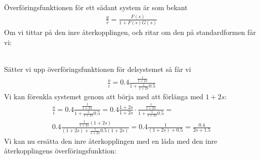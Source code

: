\documentclass[a4paper]{article}
\begin{document}
%
%
Överföringsfunktionen för ett sådant system är som bekant
\begin{align*}
  \frac{y}{r} = \frac{F(s)}{1 + F(s)G(s)}
\end{align*}
%
%
Om vi tittar på den inre återkopplingen, och ritar om den på standardformen får vi:\\
%
%
\\
%
%
Sätter vi upp överföringsfunktionen för delsystemet så får vi
\begin{align*}
  \frac{o}{i} = 0.4 \frac{\frac{1}{1+2s}}{1+\frac{1}{1+2s}0.5}
\end{align*}
%
Vi kan förenkla systemet genom att börja med att förlänga med $1+2s$:
\begin{align*}
  \frac{o}{i} = 0.4 \frac{\frac{1}{1+2s}}{1+\frac{1}{1+2s}0.5} = 0.4 \frac{1+2s}{1+2s} \cdot \frac{\frac{1}{1+2s}}{1+\frac{1}{1+2s}0.5} =\\
  0.4 \frac{\frac{1}{1+2s}(1+2s)}{(1+2s) + \frac{1}{1+2s}0.5(1+2s)} = 0.4 \frac{1}{(1+2s) + 0.5} = \frac{0.4}{2s + 1.5}
\end{align*}
%
%
Vi kan nu ersätta den inre återkopplingen med en låda med den inre återkopp\-lingens överföringsfunktion:\\
%
%
\end{document}
